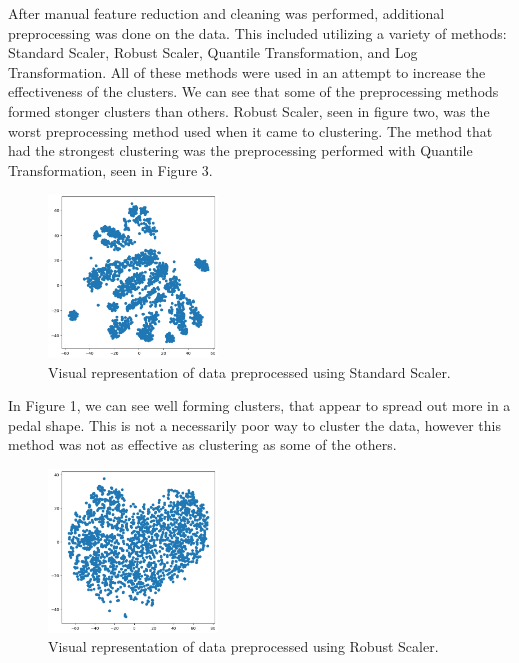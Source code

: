 \documentclass[twocolumn]{article}
\begin{document}
After manual feature reduction and cleaning was performed, additional preprocessing was done on the data. This included utilizing
a variety of methods: Standard Scaler, Robust Scaler, Quantile Transformation, and Log Transformation. All of these methods were used 
in an attempt to increase the effectiveness of the clusters. We can see that some of the preprocessing methods formed stonger clusters than others. Robust Scaler, seen in figure two, was the worst preprocessing method used when it came to clustering. The method that had the strongest clustering was the preprocessing performed with Quantile Transformation, seen in Figure 3.

\begin{figure}[H]
    \centering
    \includegraphics[width=0.4\textwidth]{images/standard_scaler.png}
    \caption{Visual representation of data preprocessed using Standard Scaler.}
\end{figure}

In Figure 1, we can see well forming clusters, that appear to spread out more in a pedal shape. This is not a necessarily poor way to cluster the data, however this method was not as effective as clustering as some of the others.

\begin{figure}[H]
    \centering
    \includegraphics[width=0.4\textwidth]{images/robust_scaler.png}
    \caption{Visual representation of data preprocessed using Robust Scaler.}
\end{figure}
\end{document}
